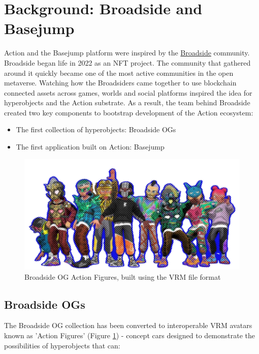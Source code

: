 \section{Background: Broadside and Basejump}

Action and the Basejump platform were inspired by the \href{https://opensea.io/collection/broadside/activity}{Broadside} community. Broadside began life in 2022 as an NFT project. The community that gathered around it quickly became one of the most active communities in the open metaverse. Watching how the Broadsiders came together to use blockchain connected assets across games, worlds and social platforms inspired the idea for hyperobjects and the Action substrate. As a result, the team behind Broadside created two key components to bootstrap development of the Action ecosystem:

\nopagebreak[4]
\begin{itemize}
\item The first collection of hyperobjects: Broadside OGs
\item The first application built on Action: Basejump
\end{itemize}


\begin{figure}
  \centering
  \includegraphics[width=\columnwidth]{images/image9.png}
  \caption{Broadside OG Action Figures, built using the VRM file format \cite{VRM2024}}
  \label{fig:broadside_og}
  \end{figure}

\subsection{Broadside OGs}

The Broadside OG collection has been converted to interoperable VRM \cite{VRM2024} avatars known as 'Action Figures' (Figure \ref{fig:broadside_og}) - concept cars designed to demonstrate the possibilities of hyperobjects that can:

